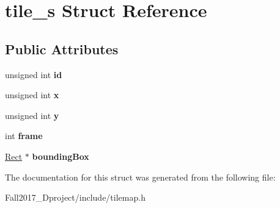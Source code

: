 \hypertarget{structtile__s}{}\section{tile\+\_\+s Struct Reference}
\label{structtile__s}
\subsection*{Public Attributes}
\begin{DoxyCompactItemize}
\item 
\mbox{\label{structtile__s_aee3838b142422606bd78c67213bf7108}} 
unsigned int {\bfseries id}
\item 
\mbox{\label{structtile__s_a11e0552c69dfedcd9ed25712d7dbd7fe}} 
unsigned int {\bfseries x}
\item 
\mbox{\label{structtile__s_a35efb9b6b84a8145fa37461d89e24c21}} 
unsigned int {\bfseries y}
\item 
\mbox{\label{structtile__s_ab8487dc3462696f91e0626acb16ea408}} 
int {\bfseries frame}
\item 
\mbox{\label{structtile__s_a4fb2a725bcd80aa4e7b8bcafdc940aba}} 
\hyperlink{structrect__s}{Rect} $\ast$ {\bfseries bounding\+Box}
\end{DoxyCompactItemize}


The documentation for this struct was generated from the following file\+:\begin{DoxyCompactItemize}
\item 
Fall2017\+\_\+Dproject/include/tilemap.\+h\end{DoxyCompactItemize}
